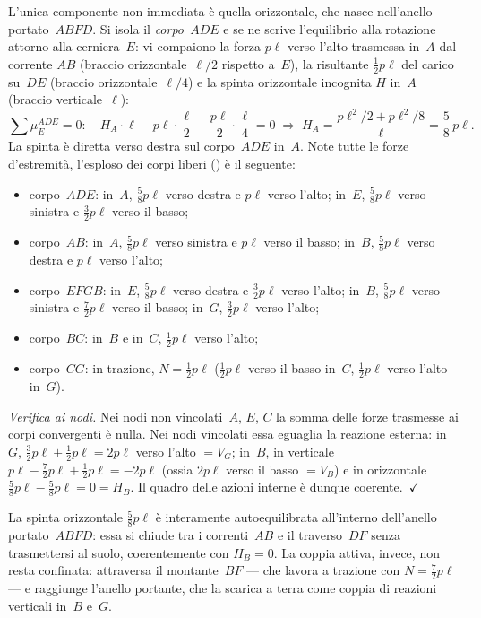 L'unica componente non immediata è quella orizzontale,
che nasce nell'anello portato~$ABFD$. Si isola il
\emph{corpo~$ADE$} e se ne scrive l'equilibrio alla
rotazione attorno alla cerniera~$E$: vi compaiono la
forza $p\ell$ verso l'alto trasmessa in~$A$ dal corrente
$AB$ (braccio orizzontale~$\ell/2$ rispetto a~$E$), la
risultante $\tfrac12 p\ell$ del carico su~$DE$ (braccio
orizzontale~$\ell/4$) e la spinta orizzontale incognita
$H$ in~$A$ (braccio verticale~$\ell$):
\[
\sum \mu_E^{ADE} = 0:\quad
H_A\cdot\ell - p\ell\cdot\frac{\ell}{2}
- \frac{p\ell}{2}\cdot\frac{\ell}{4} = 0
\;\Rightarrow\;
H_A = \frac{p\ell^2/2 + p\ell^2/8}{\ell}
= \frac{5}{8}\,p\ell .
\]
La spinta è diretta verso destra sul corpo~$ADE$ in~$A$.
Note tutte le forze d'estremità, l'esploso dei corpi liberi
() è il seguente:
\begin{itemize}[noitemsep]
	\item corpo~$ADE$: in~$A$, $\tfrac58 p\ell$ verso destra
	e $p\ell$ verso l'alto; in~$E$, $\tfrac58 p\ell$ verso
	sinistra e $\tfrac32 p\ell$ verso il basso;
	\item corpo~$AB$: in~$A$, $\tfrac58 p\ell$ verso sinistra
	e $p\ell$ verso il basso; in~$B$, $\tfrac58 p\ell$ verso
	destra e $p\ell$ verso l'alto;
	\item corpo~$EFGB$: in~$E$, $\tfrac58 p\ell$ verso destra
	e $\tfrac32 p\ell$ verso l'alto; in~$B$, $\tfrac58 p\ell$
	verso sinistra e $\tfrac72 p\ell$ verso il basso; in~$G$,
	$\tfrac32 p\ell$ verso l'alto;
	\item corpo~$BC$: in~$B$ e in~$C$, $\tfrac12 p\ell$ verso
	l'alto;
	\item corpo~$CG$: in trazione, $N = \tfrac12 p\ell$
	($\tfrac12 p\ell$ verso il basso in~$C$, $\tfrac12 p\ell$
	verso l'alto in~$G$).
\end{itemize}

\medskip
\noindent\textit{Verifica ai nodi.}
Nei nodi non vincolati~$A$, $E$, $C$ la somma delle forze
trasmesse ai corpi convergenti è nulla. Nei nodi vincolati
essa eguaglia la reazione esterna: in~$G$,
$\tfrac32 p\ell + \tfrac12 p\ell = 2p\ell$ verso l'alto
$= V_G$; in~$B$, in verticale
$p\ell - \tfrac72 p\ell + \tfrac12 p\ell = -2p\ell$
(ossia $2p\ell$ verso il basso $= V_B$) e in orizzontale
$\tfrac58 p\ell - \tfrac58 p\ell = 0 = H_B$.
Il quadro delle azioni interne è dunque coerente.~$\checkmark$

\begin{oss}
	La spinta orizzontale $\tfrac58 p\ell$ è interamente
	autoequilibrata all'interno dell'anello portato~$ABFD$:
	essa si chiude tra i correnti~$AB$ e il traverso~$DF$
	senza trasmettersi al suolo, coerentemente con
	$H_B = 0$. La coppia attiva, invece, non resta confinata:
	attraversa il montante~$BF$ --- che lavora a trazione
	con $N = \tfrac72 p\ell$ --- e raggiunge l'anello portante,
	che la scarica a terra come coppia di reazioni verticali
	in~$B$ e~$G$.
\end{oss}

